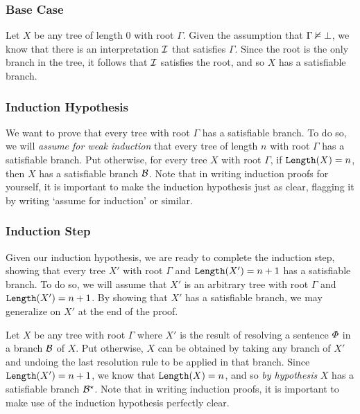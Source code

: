 \subsubsection{Base Case}

Let $X$ be any tree of length $0$ with root $\Gamma$.
Given the assumption that $\Gamma \nvDash \bot$, we know that there is an interpretation $\mathcal{I}$ that satisfies $\Gamma$.
Since the root is the only branch in the tree, it follows that $\mathcal{I}$ satisfies the root, and so $X$ has a satisfiable branch. 





\subsubsection{Induction Hypothesis}

We want to prove that every tree with root $\Gamma$ has a satisfiable branch.
To do so, we will \textit{assume for weak induction} that every tree of length $n$ with root $\Gamma$ has a satisfiable branch. 
Put otherwise, for every tree $X$ with root $\Gamma$, if $\texttt{Length}(X) = n$, then $X$ has a satisfiable branch $\mathcal{B}$. 
Note that in writing induction proofs for yourself, it is important to make the induction hypothesis just as clear, flagging it by writing `assume for induction' or similar.



\subsubsection{Induction Step}

Given our induction hypothesis, we are ready to complete the induction step, showing that every tree $X'$ with root $\Gamma$ and $\texttt{Length}(X')=n+1$ has a satisfiable branch.
To do so, we will assume that $X'$ is an arbitrary tree with root $\Gamma$ and $\texttt{Length}(X')=n+1$.
By showing that $X'$ has a satisfiable branch, we may generalize on $X'$ at the end of the proof.

Let $X$ be any tree with root $\Gamma$ where $X'$ is the result of resolving a sentence $\varPhi$ in a branch $\mathcal{B}$ of $X$.
Put otherwise, $X$ can be obtained by taking any branch of $X'$ and undoing the last resolution rule to be applied in that branch. 
Since $\texttt{Length}(X')=n+1$, we know that $\texttt{Length}(X)=n$, and so \textit{by hypothesis} $X$ has a satisfiable branch $\mathcal{B}^\star$. 
Note that in writing induction proofs, it is important to make use of the induction hypothesis perfectly clear.

